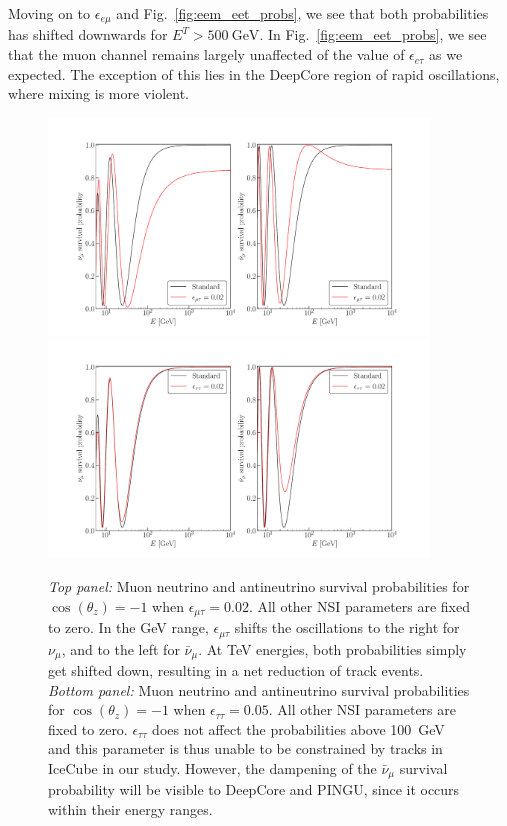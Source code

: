 \documentclass{revtex4-2}
\newcommand{\z}{\ensuremath{\cos{(\theta_z)}}}
\newcommand{\Etrue}{E^{T}}
\newcommand{\emt}{\ensuremath{\epsilon_{\mu\tau}}}
\newcommand{\eet}{\epsilon_{e\tau}}
\newcommand{\eem}{\epsilon_{e\mu}}
\newcommand{\ett}{\ensuremath{\epsilon_{\tau\tau}}}
\newcommand{\nm}{\nu_\mu}
\newcommand{\anm}{\bar\nu_\mu}
\begin{document}
Moving on to $\eem$ and Fig.~\ref{fig:eem_eet_probs}, we see that both probabilities has shifted downwards for $\Etrue > \SI{500}{\GeV}$.
In Fig.~\ref{fig:eem_eet_probs}, we see that the muon channel remains largely unaffected of the value of $\eet$ as we expected. The exception of this lies 
in the DeepCore region of rapid oscillations, where mixing is more violent. 
\begin{figure} %
    \begin{center}
        \includegraphics[width=0.9\textwidth]{figures/Pmm_emt_probs.pdf}
        \includegraphics[width=0.9\textwidth]{figures/Pmm_ett_probs.pdf}
        \caption{\emph{Top panel:} Muon neutrino and antineutrino survival probabilities for
        $\z = -1$ when $\emt = 0.02$. All other NSI parameters are fixed to zero. In the \si{\GeV} range, $\emt$ shifts the oscillations to the right for $\nm$, and to the left for $\anm$. At \si{\TeV} energies, both probabilities simply get shifted down, resulting in a net reduction of track events.
        \emph{Bottom panel:} Muon neutrino and antineutrino survival probabilities for
        $\z = -1$ when $\ett = 0.05$. All other NSI parameters are fixed to zero. $\ett$ does not affect the probabilities above \SI{100}{\GeV} and this parameter is thus unable to be constrained by tracks in IceCube in our study. However, the dampening of the $\anm$ survival probability will be visible to DeepCore and PINGU, since it occurs within their energy ranges.}
        \label{fig:emt_ett_probs}
    \end{center}
\end{figure}
\end{document}
